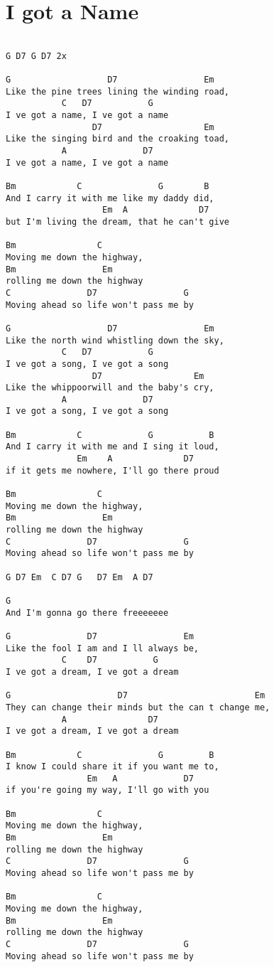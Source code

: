 \documentclass[leqno]{memoir}
\begin{document}
\chapter{I got a Name}
\begin{verbatim}

G D7 G D7 2x

G                   D7                 Em
Like the pine trees lining the winding road,
           C   D7           G   
I ve got a name, I ve got a name
                 D7                    Em
Like the singing bird and the croaking toad,
           A               D7
I ve got a name, I ve got a name

Bm            C               G        B
And I carry it with me like my daddy did,
                   Em  A              D7
but I'm living the dream, that he can't give

Bm                C
Moving me down the highway, 
Bm                 Em
rolling me down the highway
C               D7                 G
Moving ahead so life won't pass me by

G                   D7                 Em
Like the north wind whistling down the sky,
           C   D7           G
I ve got a song, I ve got a song
                 D7                  Em
Like the whippoorwill and the baby's cry,
           A               D7
I ve got a song, I ve got a song

Bm            C             G           B
And I carry it with me and I sing it loud,
              Em    A              D7
if it gets me nowhere, I'll go there proud

Bm                C
Moving me down the highway, 
Bm                 Em
rolling me down the highway
C               D7                 G
Moving ahead so life won't pass me by

G D7 Em  C D7 G   D7 Em  A D7

G
And I'm gonna go there freeeeeee

G               D7                 Em
Like the fool I am and I ll always be,
           C    D7           G
I ve got a dream, I ve got a dream

G                     D7                         Em
They can change their minds but the can t change me,
           A                D7
I ve got a dream, I ve got a dream

Bm            C               G         B
I know I could share it if you want me to,
                Em   A             D7
if you're going my way, I'll go with you

Bm                C
Moving me down the highway, 
Bm                 Em
rolling me down the highway
C               D7                 G
Moving ahead so life won't pass me by

Bm                C
Moving me down the highway, 
Bm                 Em
rolling me down the highway
C               D7                 G
Moving ahead so life won't pass me by

\end{verbatim}
\newpage
\end{document}
